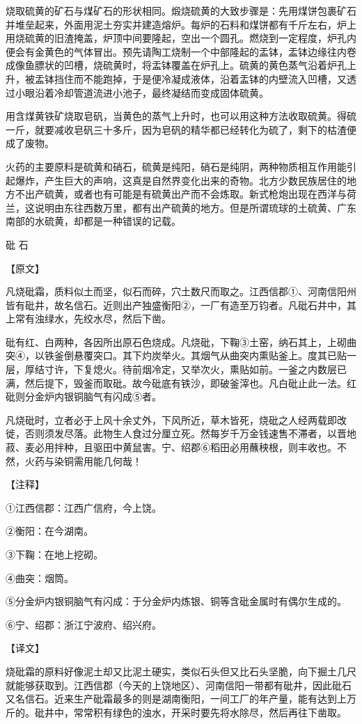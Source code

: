 \documentclass[12pt,UTF8]{ctexbook}
\begin{document}
烧取硫黄的矿石与煤矿石的形状相同。煅烧硫黄的大致步骤是：先用煤饼包裹矿石并堆垒起来，外面用泥土夯实并建造熔炉。每炉的石料和煤饼都有千斤左右，炉上用烧硫黄的旧渣掩盖，炉顶中间要隆起，空出一个圆孔。燃烧到一定程度，炉孔内便会有金黄色的气体冒出。预先请陶工烧制一个中部隆起的盂钵，盂钵边缘往内卷成像鱼膘状的凹槽，烧硫黄时，将盂钵覆盖在炉孔上。硫黄的黄色蒸气沿着炉孔上升，被盂钵挡住而不能跑掉，于是便冷凝成液体，沿着盂钵的内壁流入凹槽，又透过小眼沿着冷却管道流进小池子，最终凝结而变成固体硫黄。

用含煤黄铁矿烧取皂矾，当黄色的蒸气上升时，也可以用这种方法收取硫黄。得硫一斤，就要减收皂矾三十多斤，因为皂矾的精华都已经转化为硫了，剩下的枯渣便成了废物。

火药的主要原料是硫黄和硝石，硫黄是纯阳，硝石是纯阴，两种物质相互作用能引起爆炸，产生巨大的声响，这真是自然界变化出来的奇物。北方少数民族居住的地方不出产硫黄，或者也有可能是有硫黄出产而不会炼取。新式枪炮出现在西洋与荷兰，这说明由东往西数万里，都有出产硫黄的地方。但是所谓琉球的土硫黄、广东南部的水硫黄，却都是一种错误的记载。

砒 石

【原文】

凡烧砒霜，质料似土而坚，似石而碎，穴土数尺而取之。江西信郡①、河南信阳州皆有砒井，故名信石。近则出产独盛衡阳②，一厂有造至万钧者。凡砒石井中，其上常有浊绿水，先绞水尽，然后下凿。

砒有红、白两种，各因所出原石色烧成。凡烧砒，下鞠③土窑，纳石其上，上砌曲突④，以铁釜倒悬覆突口。其下灼炭举火。其烟气从曲突内熏贴釜上。度其已贴一层，厚结寸许，下复熄火。待前烟冷定，又举次火，熏贴如前。一釜之内数层已满，然后提下，毁釜而取砒。故今砒底有铁沙，即破釜滓也。凡白砒止此一法。红砒则分金炉内银铜脑气有闪成⑤者。

凡烧砒时，立者必于上风十余丈外，下风所近，草木皆死，烧砒之人经两载即改徙，否则须发尽落。此物生人食过分厘立死。然每岁千万金钱速售不滞者，以晋地菽、麦必用拌种，且驱田中黄鼠害。宁、绍郡⑥稻田必用蘸秧根，则丰收也。不然，火药与染铜需用能几何哉！

【注释】

①江西信郡：江西广信府，今上饶。

②衡阳：在今湖南。

③下鞠：在地上挖砌。

④曲突：烟筒。

⑤分金炉内银铜脑气有闪成：于分金炉内炼银、铜等含砒金属时有偶尔生成的。

⑥宁、绍郡：浙江宁波府、绍兴府。

【译文】

烧砒霜的原料好像泥土却又比泥土硬实，类似石头但又比石头坚脆，向下掘土几尺就能够获取到。江西信郡（今天的上饶地区）、河南信阳一带都有砒井，因此砒石又名信石。近来生产砒霜最多的则是湖南衡阳，一间工厂的年产量，能有达到上万斤的。砒井中，常常积有绿色的浊水，开采时要先将水除尽，然后再往下凿取。
\end{document}
